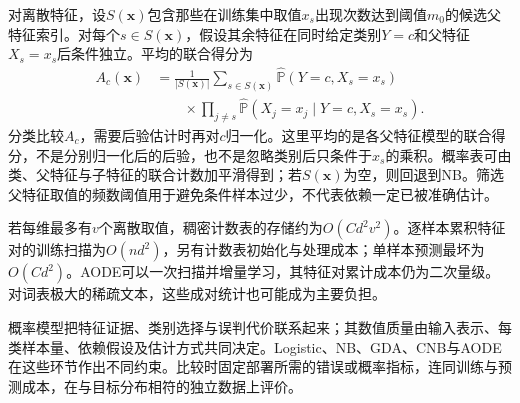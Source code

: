 对离散特征，设$S(\bm{x})$包含那些在训练集中取值$x_s$出现次数达到阈值$m_0$的候选父特征索引。对每个$s\in S(\bm{x})$，假设其余特征在同时给定类别$Y=c$和父特征$X_s=x_s$后条件独立。平均的联合得分为
\begin{equation}
  \label{eq:classification-aode}
  \begin{aligned}
    A_c(\bm{x})
      &=\frac{1}{|S(\bm{x})|}
        \sum_{s\in S(\bm{x})}
        \widehat{\mathbb{P}}(Y=c,X_s=x_s)\\
      &\qquad{}\times
        \prod_{j\neq s}
        \widehat{\mathbb{P}}(X_j=x_j\mid Y=c,X_s=x_s).
  \end{aligned}
\end{equation}
分类比较$A_c$，需要后验估计时再对$c$归一化。这里平均的是各父特征模型的联合得分，不是分别归一化后的后验，也不是忽略类别后只条件于$x_s$的乘积。概率表可由类、父特征与子特征的联合计数加平滑得到；若$S(\bm{x})$为空，则回退到NB。筛选父特征取值的频数阈值用于避免条件样本过少，不代表依赖一定已被准确估计。

若每维最多有$v$个离散取值，稠密计数表的存储约为$O(Cd^2v^2)$。逐样本累积特征对的训练扫描为$O(nd^2)$，另有计数表初始化与处理成本；单样本预测最坏为$O(Cd^2)$。AODE可以一次扫描并增量学习，其特征对累计成本仍为二次量级。对词表极大的稀疏文本，这些成对统计也可能成为主要负担。

概率模型把特征证据、类别选择与误判代价联系起来；其数值质量由输入表示、每类样本量、依赖假设及估计方式共同决定。Logistic、NB、GDA、CNB与AODE在这些环节作出不同约束。比较时固定部署所需的错误或概率指标，连同训练与预测成本，在与目标分布相符的独立数据上评价。